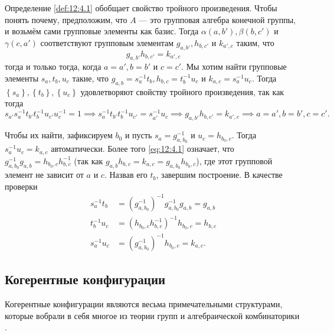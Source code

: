 Определение \ref{def:12:4.1} обобщает свойство тройного произведения. Чтобы понять почему, предположим, что $A$ --- это групповая алгебра конечной группы, и возьмём сами групповые элементы как базис. Тогда $\alpha(a,b'), \beta(b,c')$ и $\gamma(c,a')$ соответствуют групповым элементам $g_{a,b'}, h_{b,c'}$ и $k_{a',c}$ таким, что
\begin{equation}\label{eq:12:4.1}
	g_{a,b'} h_{b,c'} = k_{a',c}
\end{equation}
тогда и только тогда, когда $a=a',b=b'$ и $c=c'$. Мы хотим найти групповые элементы $s_a,t_b,u_c$ такие, что $g_{a,b}=s_a^{-1} t_b, h_{b,c}=t_b^{-1} u_c$ и $k_{a,c}=s_a^{-1} u_c$. Тогда $\left\{ s_a \right\}, \left\{ t_b \right\}, \left\{ u_c \right\}$ удовлетворяют свойству тройного произведения, так как тогда
\[
	s_{a'} s_a^{-1} t_{b'} t_b^{-1} u_{c'} u_c^{-1} = 1 \implies s_a^{-1} t_{b'} t_b^{-1} u_{c'} = s_{a'}^{-1} u_c \implies g_{a, b'} h_{b, c'} = k_{a',c} \implies a = a', b = b', c = c'.
\]

Чтобы их найти, зафиксируем $b_0$ и пусть $s_a=g_{a,b_0}^{-1}$ и $u_c=h_{b_0,c}$. Тогда $s_a^{-1} u_c = k_{a,c}$ автоматически. Более того \eqref{eq:12:4.1} означает, что $g_{a,b_0}^{-1} g_{a,b} = h_{b_0,c} h_{b,c}^{-1}$ (так как 
$g_{a,b} h_{b,c}  = k_{a,c} = g_{a,b_0} h_{b_0,c}$), где этот групповой элемент не зависит от $a$ и $c$. Назвав его $t_b$, завершим построение. В качестве проверки
\begin{align*}
  s_a^{-1} t_b & = \left( g_{a, b_0}^{-1} \right)^{-1} g_{a,b_0}^{-1} g_{a,b} = g_{a,b}\\
  t_b^{-1} u_c & = \left( h_{b_0,c} h_{b,c}^{-1} \right)^{-1} h_{b_0,c} = h_{b,c}\\
  s_a^{-1} u_c & = \left( g_{a,b_0}^{-1} \right)^{-1} h_{b_0,c} = k_{a,c}.
\end{align*}


\subsection{Когерентные конфигурации}\label{ssub:12:4.2}

Когерентные конфигурации являются весьма примечательными структурами, которые вобрали в себя многое из теории групп и алгебраической комбинаторики \cite{Hig70,Hig72,Hig75}. 

